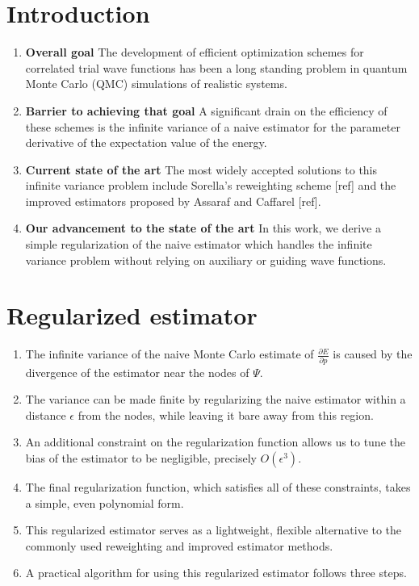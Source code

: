 \documentclass{article}
\begin{document}
\section{Introduction}
\begin{enumerate}
\item \textbf{Overall goal } The development of efficient optimization schemes for correlated trial wave functions has been a long standing problem in quantum Monte Carlo (QMC) simulations of realistic systems.

\item \textbf{Barrier to achieving that goal } A significant drain on the efficiency of these schemes is the infinite variance of a naive estimator for the parameter derivative of the expectation value of the energy.

\item \textbf{Current state of the art} The most widely accepted solutions to this infinite variance problem include Sorella's reweighting scheme [ref] and the improved estimators proposed by Assaraf and Caffarel [ref].

\item \textbf{Our advancement to the state of the art } In this work, we derive a simple regularization of the naive estimator which handles the infinite variance problem without relying on auxiliary or guiding wave functions.
\end{enumerate}

\section{Regularized estimator}
\begin{enumerate}
\item The infinite variance of the naive Monte Carlo estimate of $\frac{\partial E}{\partial p}$ is caused by the divergence of the estimator near the nodes of $\Psi$.

\item The variance can be made finite by regularizing the naive estimator within a distance $\epsilon$ from the nodes, while leaving it bare away from this region.

\item An additional constraint on the regularization function allows us to tune the bias of the estimator to be negligible, precisely $O(\epsilon^3)$. 

\item The final regularization function, which satisfies all of these constraints, takes a simple, even polynomial form.

\item This regularized estimator serves as a lightweight, flexible alternative to the commonly used reweighting and improved estimator methods.

\item A practical algorithm for using this regularized estimator follows three steps. 
\end{enumerate}
\end{document}
